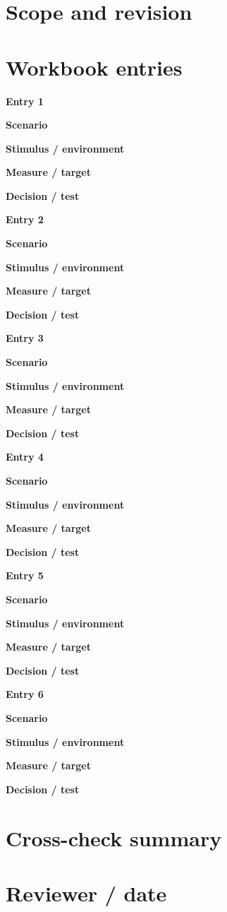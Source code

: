 \documentclass[10pt,letterpaper]{article}
\begin{document}
\DocProvenance
\section{Scope and revision}
\section{Workbook entries}
\textbf{Entry 1}\par
\textbf{Scenario}\par{}
\textbf{Stimulus / environment}\par{}
\textbf{Measure / target}\par{}
\textbf{Decision / test}\par{}
\textbf{Entry 2}\par
\textbf{Scenario}\par{}
\textbf{Stimulus / environment}\par{}
\textbf{Measure / target}\par{}
\textbf{Decision / test}\par{}
\textbf{Entry 3}\par
\textbf{Scenario}\par{}
\textbf{Stimulus / environment}\par{}
\textbf{Measure / target}\par{}
\textbf{Decision / test}\par{}
\textbf{Entry 4}\par
\textbf{Scenario}\par{}
\textbf{Stimulus / environment}\par{}
\textbf{Measure / target}\par{}
\textbf{Decision / test}\par{}
\textbf{Entry 5}\par
\textbf{Scenario}\par{}
\textbf{Stimulus / environment}\par{}
\textbf{Measure / target}\par{}
\textbf{Decision / test}\par{}
\textbf{Entry 6}\par
\textbf{Scenario}\par{}
\textbf{Stimulus / environment}\par{}
\textbf{Measure / target}\par{}
\textbf{Decision / test}\par{}
\section{Cross-check summary}
\section{Reviewer / date}
\end{document}
